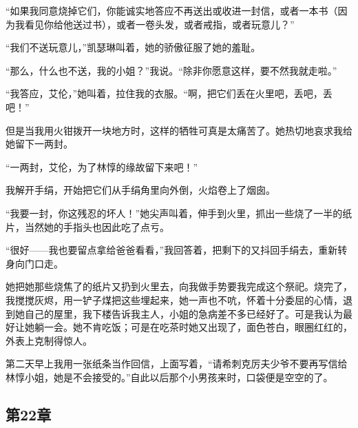 \par “如果我同意烧掉它们，你能诚实地答应不再送出或收进一封信，或者一本书（因为我看见你给他送过书），或者一卷头发，或者戒指，或者玩意儿？”
\par “我们不送玩意儿，”凯瑟琳叫着，她的骄傲征服了她的羞耻。
\par “那么，什么也不送，我的小姐？”我说。“除非你愿意这样，要不然我就走啦。”
\par “我答应，艾伦，”她叫着，拉住我的衣服。“啊，把它们丢在火里吧，丢吧，丢吧！”
\par 但是当我用火钳拨开一块地方时，这样的牺牲可真是太痛苦了。她热切地哀求我给她留下一两封。
\par “一两封，艾伦，为了林惇的缘故留下来吧！”
\par 我解开手绢，开始把它们从手绢角里向外倒，火焰卷上了烟囱。
\par “我要一封，你这残忍的坏人！”她尖声叫着，伸手到火里，抓出一些烧了一半的纸片，当然她的手指头也因此吃了点亏。
\par “很好——我也要留点拿给爸爸看看，”我回答着，把剩下的又抖回手绢去，重新转身向门口走。
\par 她把她那些烧焦了的纸片又扔到火里去，向我做手势要我完成这个祭祀。烧完了，我搅搅灰烬，用一铲子煤把这些埋起来，她一声也不吭，怀着十分委屈的心情，退到她自己的屋里，我下楼告诉我主人，小姐的急病差不多已经好了。可是我认为最好让她躺一会。她不肯吃饭；可是在吃茶时她又出现了，面色苍白，眼圈红红的，外表上克制得惊人。
\par 第二天早上我用一张纸条当作回信，上面写着，“请希刺克厉夫少爷不要再写信给林惇小姐，她是不会接受的。”自此以后那个小男孩来时，口袋便是空空的了。

\subsection{第22章}

